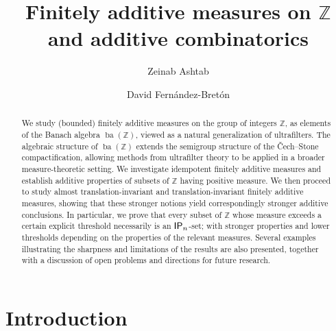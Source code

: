 \documentclass{jloganal}
\title{Finitely additive measures on $\mathbb Z$ and additive combinatorics}
\author{Zeinab Ashtab}
\author{David Fernández-Bretón}
\theoremstyle{definition}
\newcommand{\ba}{\mathop{\mathrm{ba}}}
\newcommand{\ip}{\mathnormal{\mathsf{IP}}}
\begin{document}
\begin{abstract}    %
   We study (bounded) finitely additive measures on the group of integers $\mathbb Z$, as elements of the Banach algebra $\ba(\mathbb Z)$, viewed as a natural generalization of ultrafilters. The algebraic structure of $\ba(\mathbb Z)$ extends the semigroup structure of the \v{C}ech--Stone compactification, allowing methods from ultrafilter theory to be applied in a broader measure-theoretic setting. We investigate idempotent finitely additive measures and establish additive properties of subsets of $\mathbb Z$ having positive measure. We then proceed to study almost translation-invariant and translation-invariant finitely additive measures, showing that these stronger notions yield correspondingly stronger additive conclusions. In particular, we prove that every subset of $\mathbb Z$ whose measure exceeds a certain explicit threshold necessarily is an $\ip_{n}$-set; with stronger properties and lower thresholds depending on the properties of the relevant measures. Several examples illustrating the sharpness and limitations of the results are also presented, together with a discussion of open problems and directions for future research.
\end{abstract}

\maketitle



\section{Introduction}
\end{document}
